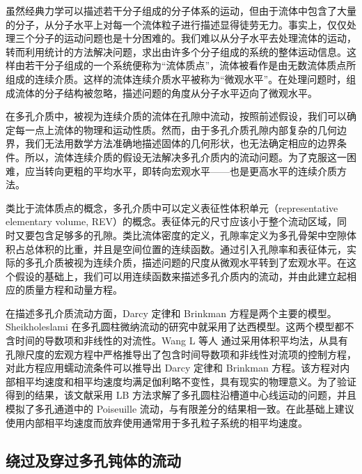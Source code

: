 虽然经典力学可以描述若干分子组成的分子体系的运动，但由于流体中包含了大量的分子，从分子水平上对每一个流体粒子进行描述显得徒劳无力。事实上，仅仅处理三个分子的运动问题也是十分困难的。我们难以从分子水平去处理流体的运动，转而利用统计的方法解决问题，求出由许多个分子组成的系统的整体运动信息。这样由若干分子组成的一个系统便称为“流体质点”，流体被看作是由无数流体质点所组成的连续介质。这样的流体连续介质水平被称为“微观水平”。在处理问题时，组成流体的分子结构被忽略，描述问题的角度从分子水平迈向了微观水平。


在多孔介质中，被视为连续介质的流体在孔隙中流动，按照前述假设，我们可以确定每一点上流体的物理和运动性质。然而，由于多孔介质孔隙内部复杂的几何边界，我们无法用数学方法准确地描述固体的几何形状，也无法确定相应的边界条件。所以，流体连续介质的假设无法解决多孔介质内的流动问题。为了克服这一困难，应当转向更粗的平均水平，即转向宏观水平——也是更高水平的连续介质方法。

类比于流体质点的概念，多孔介质中可以定义表征性体积单元（representative elementary volume, REV）的概念。表征体元的尺寸应该小于整个流动区域，同时又要包含足够多的孔隙。类比流体密度的定义，孔隙率定义为多孔骨架中空隙体积占总体积的比重，并且是空间位置的连续函数。通过引入孔隙率和表征体元，实际的多孔介质被视为连续介质，描述问题的尺度从微观水平转到了宏观水平。在这个假设的基础上，我们可以用连续函数来描述多孔介质内的流动，并由此建立起相应的质量方程和动量方程。


在描述多孔介质流动方面，Darcy 定律和 Brinkman 方程是两个主要的模型。Sheikholeslami\cite{Sheikholeslami2017} 在多孔圆柱微纳流动的研究中就采用了达西模型。这两个模型都不含时间的导数项和非线性的对流性。Wang L 等人 \cite{Wang2015} 通过采用体积平均法，从具有孔隙尺度的宏观方程中严格推导出了包含时间导数项和非线性对流项的控制方程，对此方程应用蠕动流条件可以推导出 Darcy 定律和 Brinkman 方程。该方程对内部相平均速度和相平均速度均满足伽利略不变性，具有现实的物理意义。为了验证得到的结果，该文献采用 LB 方法求解了多孔圆柱沿槽道中心线运动的问题，并且模拟了多孔通道中的 Poiseuille 流动，与有限差分的结果相一致。在此基础上建议使用内部相平均速度而放弃使用通常用于多孔粒子系统的相平均速度。%

\subsection{绕过及穿过多孔钝体的流动}

